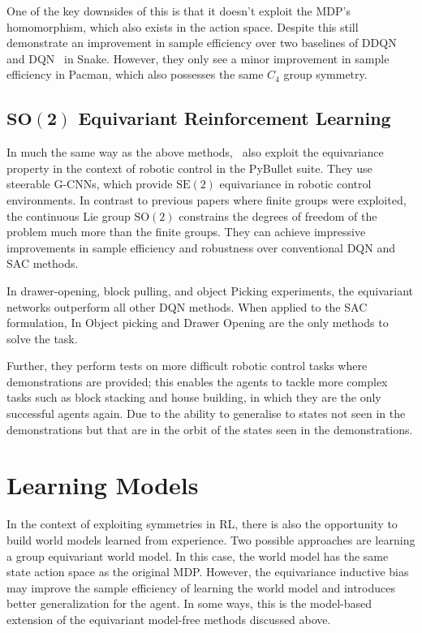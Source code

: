 One of the key downsides of this is that it doesn't exploit the MDP's homomorphism, which also exists in the action space. Despite this \cite{mondal2020group} still demonstrate an improvement in sample efficiency over two baselines of DDQN~\cite{van2016deep} and DQN~\cite{mnih2013playing} in Snake. However, they only see a minor improvement in sample efficiency in Pacman, which also possesses the same $C_4$ group symmetry.

\subsection{$\mathbf{\text{SO}(2)}$ Equivariant Reinforcement Learning}

In much the same way as the above methods,~\cite{wang2022so2} also exploit the equivariance property in the context of robotic control in the PyBullet suite\cite{coumans2021}. They use steerable G-CNNs\cite{weiler2019general}, which provide $\text{SE}(2)$ equivariance in robotic control environments. In contrast to previous papers where finite groups were exploited, the continuous Lie group $\text{SO}(2)$ constrains the degrees of freedom of the problem much more than the finite groups. They can achieve impressive improvements in sample efficiency and robustness over conventional DQN and SAC methods.

In drawer-opening, block pulling, and object Picking experiments, the equivariant networks outperform all other DQN methods. When applied to the SAC formulation, In Object picking and Drawer Opening are the only methods to solve the task.

Further, they perform tests on more difficult robotic control tasks where demonstrations are provided; this enables the agents to tackle more complex tasks such as block stacking and house building, in which they are the only successful agents again. Due to the ability to generalise to states not seen in the demonstrations but that are in the orbit of the states seen in the demonstrations.


\section{Learning Models}
In the context of exploiting symmetries in RL, there is also the opportunity to build world models learned from experience. Two possible approaches are learning a group equivariant world model. In this case, the world model has the same state action space as the original MDP. However, the equivariance inductive bias may improve the sample efficiency of learning the world model and introduces better generalization for the agent. In some ways, this is the model-based extension of the equivariant model-free methods discussed above.

